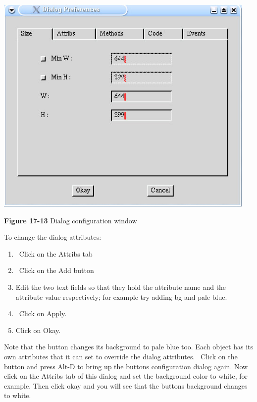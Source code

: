 \begin{center}
\includegraphics[width=5.0in,height=4.25in]{ub-img/ub-img63.jpg}
\end{center}

{\sffamily\bfseries Figure 17-13}
{\sffamily Dialog configuration window}

\bigskip

To change the dialog attributes:

\begin{enumerate}
\item \ Click on the Attribs tab

\item \ Click on the Add button


\item Edit the two text fields so that they hold the attribute name and
the attribute value respectively; for example try adding
{\textquotedbl}bg{\textquotedbl} and {\textquotedbl}pale
blue{\textquotedbl}.
\item \ Click on Apply.

\item Click on Okay.
\end{enumerate}

\bigskip

Note that the button changes its background to pale blue too. Each
object has its own attributes that it can set to override the dialog
attributes. \ Click on the button and press Alt-D to bring up the
button{\textquotesingle}s configuration dialog again. Now click on the
Attribs tab of this dialog and set the background color to white, for
example. Then click okay and you will see that the
button{\textquotesingle}s background changes to white.

